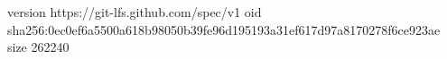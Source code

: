 version https://git-lfs.github.com/spec/v1
oid sha256:0ec0ef6a5500a618b98050b39fe96d195193a31ef617d97a8170278f6ce923ae
size 262240
